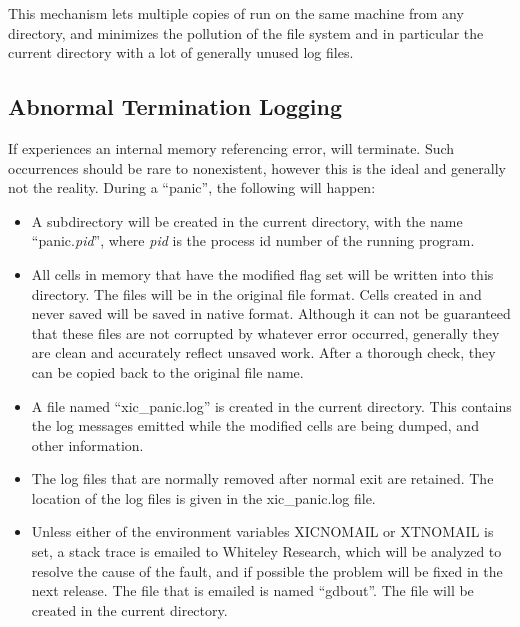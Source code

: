 \begin{itemize}
This mechanism lets multiple copies of {\Xic} run on the same machine
from any directory, and minimizes the pollution of the file system and
in particular the current directory with a lot of generally unused log
files.

\subsection{Abnormal Termination Logging}
If {\Xic} experiences an internal memory referencing error, {\Xic}
will terminate.  Such occurrences should be rare to nonexistent,
however this is the ideal and generally not the reality.  During a
``panic'', the following will happen:

\begin{itemize}
\item{A subdirectory will be created in the current directory, with
the name ``{\vt panic.}{\it pid\/}'', where {\it pid} is the process
id number of the running program.}

\item{All cells in memory that have the modified flag set will be
written into this directory.  The files will be in the original file
format.  Cells created in {\Xic} and never saved will be saved in
native format.  Although it can not be guaranteed that these files are
not corrupted by whatever error occurred, generally they are clean and
accurately reflect unsaved work.  After a thorough check, they can be
copied back to the original file name.}

\item{A file named ``{\vt xic\_panic.log}'' is created in the current
directory.  This contains the log messages emitted while the modified
cells are being dumped, and other information.}

\item{The log files that are normally removed after normal exit are
retained.  The location of the log files is given in the {\vt
xic\_panic.log} file.}

\item{Unless either of the environment variables {\et XICNOMAIL} or
{\et XTNOMAIL} is set, a stack trace is emailed to Whiteley Research,
which will be analyzed to resolve the cause of the fault, and if
possible the problem will be fixed in the next {\Xic} release.  The
file that is emailed is named ``{\vt gdbout}''.  The file will be
created in the current directory.}
\end{itemize}


\end{itemize}
